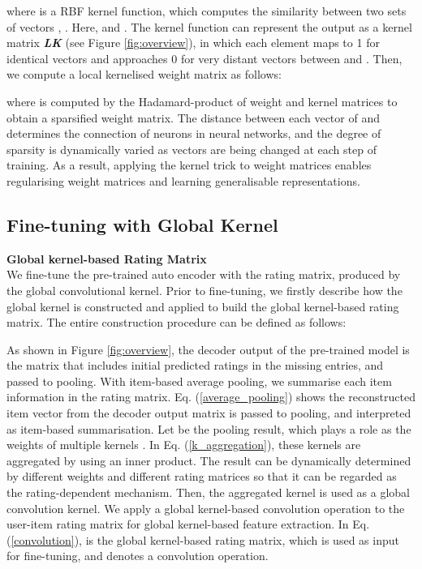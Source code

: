 \documentclass[sigconf]{acmart}
\begin{document}
where  is a RBF kernel function, which computes the similarity between two sets of vectors , . Here,  and . The kernel function can represent the output as a kernel matrix \textbf{\textit{LK}} (see Figure \ref{fig:overview}), in which each element maps to 1 for identical vectors and approaches 0 for very distant vectors between  and . Then, we compute a local kernelised weight matrix as follows:
\setlength{\belowdisplayskip}{4pt}
\setlength{\abovedisplayskip}{4pt}

where  is computed by the Hadamard-product of weight and kernel matrices to obtain a sparsified weight matrix. The distance between each vector of  and  determines the connection of neurons in neural networks, and the degree of sparsity is dynamically varied as vectors are being changed at each step of training. As a result, applying the kernel trick to weight matrices enables regularising weight matrices and learning generalisable representations.

\subsection{Fine-tuning with Global Kernel}
\textbf{Global kernel-based Rating Matrix}\\
We fine-tune the pre-trained auto encoder with the rating matrix, produced by the global convolutional kernel. Prior to fine-tuning, we firstly describe how the global kernel is constructed and applied to build the global kernel-based rating matrix. The entire construction procedure can be defined as follows:



As shown in Figure \ref{fig:overview}, the decoder output of the pre-trained model is the matrix that includes initial predicted ratings in the missing entries, and passed to pooling. With item-based average pooling, we summarise each item information in the rating matrix. Eq. (\ref{average_pooling}) shows the reconstructed item vector  from the decoder output matrix  is passed to pooling, and interpreted as item-based summarisation. Let  be the pooling result, which plays a role as the weights of multiple kernels . In Eq. (\ref{k_aggregation}), these kernels are aggregated by using an inner product. The result can be dynamically determined by different weights and different rating matrices so that it can be regarded as the rating-dependent mechanism. Then, the aggregated kernel  is used as a global convolution kernel. We apply a global kernel-based convolution operation to the user-item rating matrix for global kernel-based feature extraction. In Eq. (\ref{convolution}),  is the global kernel-based rating matrix, which is used as input for fine-tuning, and  denotes a convolution operation.
\end{document}
